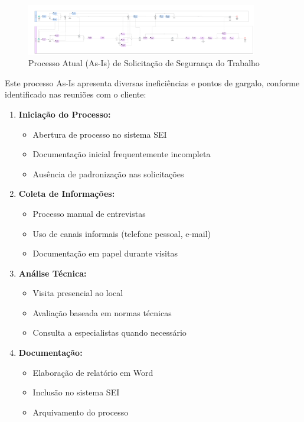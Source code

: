 \documentclass[12pt,a4paper]{article}
\begin{document}
\begin{figure}[h]
\centering
\includegraphics[width=0.9\textwidth]{images/AS-IS.jpg}
\caption{Processo Atual (As-Is) de Solicitação de Segurança do Trabalho}
\end{figure}

Este processo As-Is apresenta diversas ineficiências e pontos de gargalo, conforme identificado nas reuniões com o cliente:

\begin{enumerate}
    \item \textbf{Iniciação do Processo:}
    \begin{itemize}
        \item Abertura de processo no sistema SEI
        \item Documentação inicial frequentemente incompleta
        \item Ausência de padronização nas solicitações
    \end{itemize}
    
    \item \textbf{Coleta de Informações:}
    \begin{itemize}
        \item Processo manual de entrevistas
        \item Uso de canais informais (telefone pessoal, e-mail)
        \item Documentação em papel durante visitas
    \end{itemize}
    
    \item \textbf{Análise Técnica:}
    \begin{itemize}
        \item Visita presencial ao local
        \item Avaliação baseada em normas técnicas
        \item Consulta a especialistas quando necessário
    \end{itemize}
    
    \item \textbf{Documentação:}
    \begin{itemize}
        \item Elaboração de relatório em Word
        \item Inclusão no sistema SEI
        \item Arquivamento do processo
    \end{itemize}
\end{enumerate}
\end{document}
